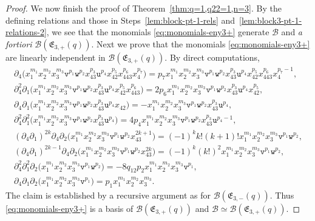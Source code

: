 \documentclass[pdftex]{sigma}
\numberwithin{equation}{section}
\newcommand{\toba}{\mathscr B}
\newcommand{\ut}{\mathtt{u}}
\newcommand{\vt}{\mathtt{v}}
\newcommand{\wt}{\mathtt{w}}
\newcommand{\eny}{\mathfrak{E}}
\begin{document}
\begin{proof}
We now finish the proof of Theorem~\ref{thm:q=1,q22=1,n=3}.
By the defining relations and those in Steps~\ref{lem:block-pt-1-rels} and~\ref{lem:block3-pt-1-relations-2}, we see that the monomials \eqref{eq:monomials-eny3+} generate $\toba$ and \emph{a fortiori} $\toba(\eny_{3,+}(q))$.
Next we prove that the monomials \eqref{eq:monomials-eny3+} are linearly independent in $\toba(\eny_{3,+}(q))$.
By direct computations,
\begin{gather*}
\partial_4 \big(x_1^{m_1} x_2^{m_2} x_3^{m_3} \vt^{p_1} \wt^{p_2} x_{43}^{p_3} \ut^{p_4} x_{42}^{p_5} x_{443}^{p_6} x_4^{p_7}\big)
 = p_7 x_1^{m_1} x_2^{m_2} x_3^{m_3} \vt^{p_1} \wt^{p_2} x_{43}^{p_3} \ut^{p_4} x_{42}^{p_5} x_{443}^{p_6} x_4^{p_7-1},
\\[.5mm]
\partial_4^2 \partial_1 \big(x_1^{m_1} x_2^{m_2} x_3^{m_3} \vt^{p_1} \wt^{p_2} x_{43}^{p_3} \ut^{p_4} x_{42}^{p_5} x_{443}^{p_6}\big)
= 2p_6 x_1^{m_1} x_2^{m_2} x_3^{m_3} \vt^{p_1} \wt^{p_2} x_{43}^{p_3} \ut^{p_4} x_{42}^{p_5},
\\[.5mm]
\partial_4 \partial_1 \big(x_1^{m_1} x_2^{m_2} x_3^{m_3} \vt^{p_1} \wt^{p_2} x_{43}^{p_3} \ut^{p_4} x_{42} \big) =
-x_1^{m_1} x_2^{m_2} x_3^{m_3} \vt^{p_1} \wt^{p_2} x_{43}^{p_3} \ut^{p_4},
\\[.5mm]
\partial_4^2 \partial_1^2 \big( x_1^{m_1} x_2^{m_2} x_3^{m_3} \vt^{p_1} \wt^{p_2} x_{43}^{p_3} \ut^{p_4} \big) = 4p_4 x_1^{m_1} x_2^{m_2} x_3^{m_3} \vt^{p_1} \wt^{p_2} x_{43}^{p_3} \ut^{p_4-1},
\\[.5mm]
(\partial_4 \partial_1)^{2k} \partial_4 \partial_2 \big( x_1^{m_1} x_2^{m_2} x_3^{m_3} \vt^{p_1} \wt^{p_2} x_{43}^{2k+1}\big) = (-1)^k k!(k+1)! x_1^{m_1} x_2^{m_2} x_3^{m_3} \vt^{p_1} \wt^{p_2},
\\[.5mm]
(\partial_4 \partial_1)^{2k-1} \partial_4 \partial_2 \big( x_1^{m_1} x_2^{m_2} x_3^{m_3} \vt^{p_1} \wt^{p_2} x_{43}^{2k}\big) =
(-1)^k (k!)^2 x_1^{m_1} x_2^{m_2} x_3^{m_3} \vt^{p_1} \wt^{p_2},
\\[.5mm]
\partial_4^2 \partial_1^2 \partial_2 \big( x_1^{m_1} x_2^{m_2} x_3^{m_3} \vt^{p_1} \wt^{p_2}\big) =
-8q_{12}p_2 x_1^{m_1} x_2^{m_2} x_3^{m_3} \vt^{p_1},
\\[.5mm]
\partial_4 \partial_1 \partial_2 \big( x_1^{m_1} x_2^{m_2} x_3^{m_3} \vt^{p_1}\big) =
p_1 x_1^{m_1} x_2^{m_2} x_3^{m_3}.
\end{gather*}
The claim is established by a recursive argument as for $\toba(\eny_{3,-}(q))$. Thus \eqref{eq:monomials-eny3+} is a basis of $\toba(\eny_{3,+}(q))$ and $\toba \simeq \toba(\eny_{3,+}(q))$.
\end{proof}
\end{document}
